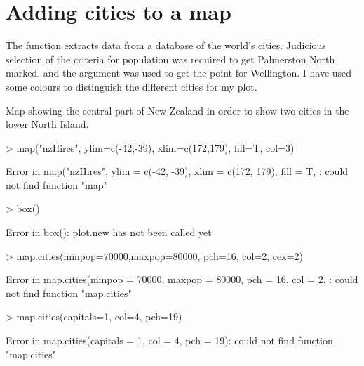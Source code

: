 \section{Adding cities to a map} 
 
The  function extracts data from a database of the world's cities. Judicious selection of the criteria for population was required to get Palmerston North marked, and the  argument was used to get the point for Wellington. I have used some colours to distinguish the different cities for my plot. 
 
\begin{exhibit} 
\caption{Map showing the central part of New Zealand in order to show two cities in the lower North Island.} 
\label{PartNZ} 
\begin{center} 

\begin{Schunk}
\begin{Sinput}
> map("nzHires", ylim=c(-42,-39), xlim=c(172,179), fill=T, col=3) 
\end{Sinput}
\begin{Soutput}
Error in map("nzHires", ylim = c(-42, -39), xlim = c(172, 179), fill = T, : could not find function "map"
\end{Soutput}
\begin{Sinput}
> box() 
\end{Sinput}
\begin{Soutput}
Error in box(): plot.new has not been called yet
\end{Soutput}
\begin{Sinput}
> map.cities(minpop=70000,maxpop=80000, pch=16, col=2, cex=2) 
\end{Sinput}
\begin{Soutput}
Error in map.cities(minpop = 70000, maxpop = 80000, pch = 16, col = 2, : could not find function "map.cities"
\end{Soutput}
\begin{Sinput}
> map.cities(capitals=1, col=4, pch=19) 
\end{Sinput}
\begin{Soutput}
Error in map.cities(capitals = 1, col = 4, pch = 19): could not find function "map.cities"
\end{Soutput}
\end{Schunk}

\end{center} 
\end{exhibit} 
 
